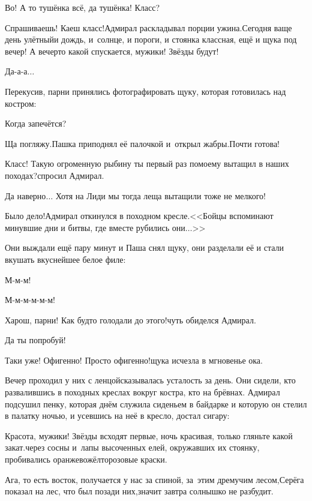 \diagdash Во! А то тушёнка всё, да тушёнка! Класс?

\diagdash Спрашиваешь! Каеш класс!\mdash Адмирал раскладывал порции ужина.\mdash Сегодня ваще день улётный\mdash и дождь, и~солнце, и пороги, и стоянка классная, ещё и щука под вечер! А вечер\sdash то какой спускается, мужики! Звёзды будут!

\diagdash Да-а-а$\ldots$

Перекусив, парни принялись фотографировать щуку, которая готовилась над костром:

\diagdash Когда запечётся?

\diagdash Ща погляжу.\mdash Пашка приподнял её палочкой и~открыл жабры.\mdash Почти готова!

\diagdash Класс! Такую огроменную рыбину ты первый раз по\sdash моему вытащил в наших походах?\mdash спросил Адмирал.

\diagdash Да наверно$\ldots$ Хотя на Лиди мы тогда леща вытащили тоже не мелкого! 

\diagdash Было дело!\mdash Адмирал откинулся в походном кресле.\mdash <<Бойцы вспоминают минувшие дни и битвы, где вместе рубились они$\ldots$>>

Они выждали ещё пару минут и Паша снял щуку, они разделали её и стали вкушать вкуснейшее белое филе:

\diagdash М-м-м!

\diagdash М-м-м-м-м-м!

\diagdash Харош, парни! Как будто голодали до этого!\mdash чуть обиделся Адмирал.

\diagdash Да ты попробуй!

\diagdash Таки уже! Офигенно! Просто офигенно!\mdash щука исчезла в мгновенье ока.

Вечер проходил у них с ленцой\mdash сказывалась усталость за день. Они сидели, кто развалившись в походных креслах вокруг костра, кто на брёвнах. Адмирал подсушил пенку, которая днём служила сиденьем в байдарке и которую он стелил в палатку ночью, и усевшись на неё в кресло, достал сигару:

\diagdash Красота, мужики! Звёзды всходят первые, ночь красивая, только гляньте какой закат.\mdash через сосны и~лапы высоченных елей, окружавших их стоянку, пробивались оранжево\sdash жёлто\sdash розовые краски.

\diagdash Ага, то есть восток, получается у нас за спиной, за~этим дремучим лесом,\mdash Серёга показал на лес, что был позади них,\mdash значит завтра солнышко не разбудит. 

